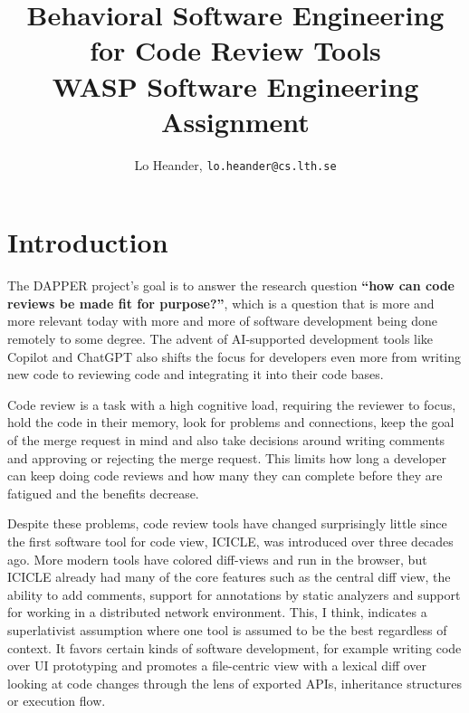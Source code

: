 \documentclass[a4paper,twocolumn]{article}
\begin{document}
\title{Behavioral Software Engineering for Code Review Tools\\
\large WASP Software Engineering Assignment} \author{\small Lo Heander,
\texttt{\small lo.heander@cs.lth.se}}
\date{}

\maketitle

\section{Introduction}

The DAPPER project's goal is to answer the research question \textbf{``how can
code reviews be made fit for purpose?''}, which is a question that is more and
more relevant today with more and more of software development being done
remotely to some degree. The advent of AI-supported development tools like
Copilot\cite{bird_taking_2023} and ChatGPT\cite{sobania_analysis_2023} also
shifts the focus for developers even more from writing new code to reviewing
code and integrating it into their code bases. 

Code review is a task with a high cognitive
load\cite{pascarella_information_2018}, requiring the reviewer to focus, hold
the code in their memory, look for problems and connections, keep the goal of
the merge request in mind and also take decisions around writing comments and
approving or rejecting the merge request. This limits how long a developer can
keep doing code reviews and how many they can complete before they are fatigued
and the benefits decrease. 

Despite these problems, code review tools have changed surprisingly little since
the first software tool for code view, ICICLE\cite{brothers_icicle_1990}, was
introduced over three decades ago. More modern tools have colored diff-views and
run in the browser, but ICICLE already had many of the core features such as the
central diff view, the ability to add comments, support for annotations by
static analyzers and support for working in a distributed network environment.
This, I think, indicates a superlativist
assumption\cite{green1991comprehensibility} where one tool is assumed to be the
best regardless of context. It favors certain kinds of software development, for
example writing code over UI prototyping and promotes a file-centric view with a
lexical diff over looking at code changes through the lens of exported APIs,
inheritance structures or execution flow. 
\end{document}
